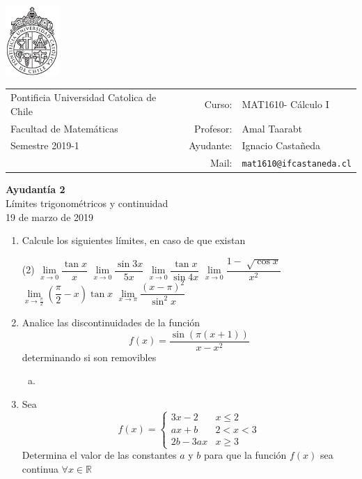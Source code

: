 \documentclass[12pt]{article}
\makeatletter
\newenvironment{preguntas}
{\begin{enumerate}\itemsep12pt
	}
	{
	\end{enumerate}
}
\newcommand{\ayudantia}{{\sc Ayudantía 2}}
\newcommand{\tituloayu}{Límites trigonométricos y continuidad}
\newcommand{\fecha}{19 de marzo de 2019}
\newcommand{\sigla}{MAT1610}
\newcommand{\nombre}{Cálculo I}
\newcommand{\profesor}{Amal Taarabt}
\newcommand{\ano}{2019}
\newcommand{\semestre}{1}
\newcommand{\mail}{mat1610@ifcastaneda.cl}
\newcommand{\ra}{\rightarrow}
\newcommand{\R}{\mathbb{R}}
\makeatother
\begin{document}
\thispagestyle{empty}

\begin{minipage}{2cm}
	\includegraphics[width=2cm]{../../../../img/logo.pdf}
	\vspace{0.5cm}
\end{minipage}
\begin{minipage}{\linewidth}
	\begin{tabular}{lrl}
		{\scriptsize\sc Pontificia Universidad Catolica de Chile} & \hspace*{0.7in}Curso: &
		\sigla  - \nombre\\
		{\sc Facultad de Matemáticas}&
		Profesor: & \profesor \\
		{\sc Semestre \ano-\semestre} & Ayudante: & {Ignacio Castañeda}\\
		& {Mail:} & \texttt{\mail}
	\end{tabular}
\end{minipage}

\vspace{-10mm}
\begin{center}
	{\LARGE\bf \ayudantia}\\
	\vspace{0.1cm}
	{\tituloayu}\\
	\vspace{0.1cm}
	\fecha\\
	\vspace{0.4cm}
\end{center}

\begin{preguntas}
\item Calcule los siguientes límites, en caso de que existan
\begin{tasks}(2)
\task $\lim\limits_{x \ra 0} \dfrac{\tan x}{x}$ 
\task $\lim\limits_{x \ra 0} \dfrac{\sin 3x}{5x}$ 
\task $\lim\limits_{x \ra 0} \dfrac{\tan x}{\sin 4x}$ 
\task $\lim\limits_{x \ra 0} \dfrac{1 - \sqrt[]{\cos x}}{x^2}$ 
\task $\lim\limits_{x \ra \frac{\pi}{2}} \left(\dfrac{\pi}{2} - x \right) \tan x$ 
\task $\lim\limits_{x \ra \pi} \dfrac{(x - \pi)^2}{\sin ^2 x}$ 
\end{tasks}
\item Analice las discontinuidades de la función
$$ f(x) = \dfrac{\sin(\pi(x+1))}{x-x^2} $$
determinando si son removibles
\begin{enumerate}[a)]
\item 
\end{enumerate}
\item Sea 
$$f(x) = \begin{cases}
3x - 2 & x \leq 2\\
ax+b & 2 < x < 3 \\
2b-3ax & x \geq 3
\end{cases}$$
Determina el valor de las constantes $a$ y $b$ para que la función $f(x)$ sea continua $\forall x \in \R$
\end{preguntas}
\end{document}
